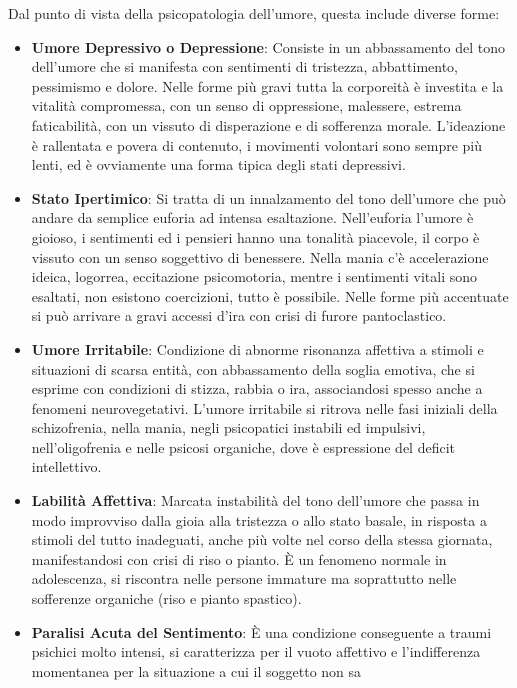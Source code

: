 \documentclass[]{article}
\begin{document}
Dal punto di vista della psicopatologia dell'umore, questa include
diverse forme:

\begin{itemize}
\item
  \textbf{Umore Depressivo o Depressione}: Consiste in un abbassamento
  del tono dell'umore che si manifesta con sentimenti di tristezza,
  abbattimento, pessimismo e dolore. Nelle forme più gravi tutta la
  corporeità è investita e la vitalità compromessa, con un senso di
  oppressione, malessere, estrema faticabilità, con un vissuto di
  disperazione e di sofferenza morale. L'ideazione è rallentata e povera
  di contenuto, i movimenti volontari sono sempre più lenti, ed è
  ovviamente una forma tipica degli stati depressivi.
\item
  \textbf{Stato Ipertimico}: Si tratta di un innalzamento del tono
  dell'umore che può andare da semplice euforia ad intensa esaltazione.
  Nell'euforia l'umore è gioioso, i sentimenti ed i pensieri hanno una
  tonalità piacevole, il corpo è vissuto con un senso soggettivo di
  benessere. Nella mania c'è accelerazione ideica, logorrea, eccitazione
  psicomotoria, mentre i sentimenti vitali sono esaltati, non esistono
  coercizioni, tutto è possibile. Nelle forme più accentuate si può
  arrivare a gravi accessi d'ira con crisi di furore pantoclastico.
\item
  \textbf{Umore Irritabile}: Condizione di abnorme risonanza affettiva a
  stimoli e situazioni di scarsa entità, con abbassamento della soglia
  emotiva, che si esprime con condizioni di stizza, rabbia o ira,
  associandosi spesso anche a fenomeni neurovegetativi. L'umore
  irritabile si ritrova nelle fasi iniziali della schizofrenia, nella
  mania, negli psicopatici instabili ed impulsivi, nell'oligofrenia e
  nelle psicosi organiche, dove è espressione del deficit intellettivo.
\item
  \textbf{Labilità Affettiva}: Marcata instabilità del tono dell'umore
  che passa in modo improvviso dalla gioia alla tristezza o allo stato
  basale, in risposta a stimoli del tutto inadeguati, anche più volte
  nel corso della stessa giornata, manifestandosi con crisi di riso o
  pianto. È un fenomeno normale in adolescenza, si riscontra nelle
  persone immature ma soprattutto nelle sofferenze organiche (riso e
  pianto spastico).
\item
  \textbf{Paralisi Acuta del Sentimento}: È una condizione conseguente a
  traumi psichici molto intensi, si caratterizza per il vuoto affettivo
  e l'indifferenza momentanea per la situazione a cui il soggetto non sa

\end{itemize}
\end{document}
